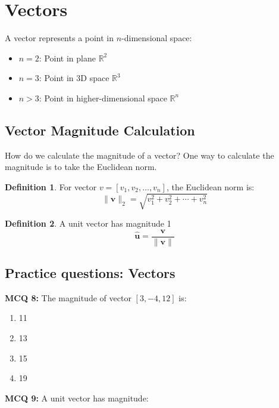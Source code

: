 \documentclass[11pt,a4paper]{article}
\theoremstyle{definition}
\newtheorem{definition}{Definition}[section]
\begin{document}
\section{Vectors}

A vector represents a point in $n$-dimensional space:
\begin{itemize}
    \item $n = 2$: Point in plane $\mathbb{R}^2$
    \item $n = 3$: Point in 3D space $\mathbb{R}^3$
    \item $n > 3$: Point in higher-dimensional space $\mathbb{R}^n$
\end{itemize}

\subsection{Vector Magnitude Calculation}

How do we calculate the magnitude of a vector?
One way to calculate the magnitude is to take the Euclidean norm. 

\begin{defbox}
\begin{definition}
For vector $v = [v_1, v_2, \ldots, v_n]$, the Euclidean norm is:
\[\|\mathbf{v}\|_2 = \sqrt{v_1^2 + v_2^2 + \cdots + v_n^2}\]
\end{definition}
\end{defbox}


\begin{defbox}
\begin{definition}
A unit vector has magnitude 1
\[\hat{\mathbf{u}} = \frac{\mathbf{v}}{\|\mathbf{v}\|}\]
\end{definition}
\end{defbox}

\subsection{Practice questions: Vectors}

\textbf{MCQ 8:} The magnitude of vector $[3, -4, 12]$ is:

\begin{enumerate}
    \item 11
    \item 13
    \item 15
    \item 19
\end{enumerate}

\noindent \textbf{MCQ 9:} A unit vector has magnitude:
\end{document}
